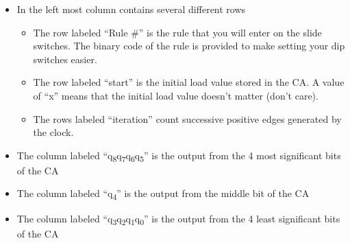 \begin{itemize}
\item
In the left most column contains several different rows

\begin{itemize}
    \item
        The row labeled ``Rule \#'' is the rule that you will enter on the
        slide switches. The binary code of the rule is provided to make
        setting your dip switches easier.
    \item
        The row labeled ``start'' is the initial load value stored in the
        CA. A value of ``x'' means that the initial load value doesn't
        matter (don't care).
    \item
        The rows labeled ``iteration'' count successive positive edges
        generated by the clock.
\end{itemize}
\item
The column labeled
``q\textsubscript{8}q\textsubscript{7}q\textsubscript{6}q\textsubscript{5}''
is the output from the 4 most significant bits of the CA
\item
The column labeled ``q\textsubscript{4}'' is the output from the
middle bit of the CA
\item
The column labeled
``q\textsubscript{3}q\textsubscript{2}q\textsubscript{1}q\textsubscript{0}''
is the output from the 4 least significant bits of the CA
\end{itemize}

